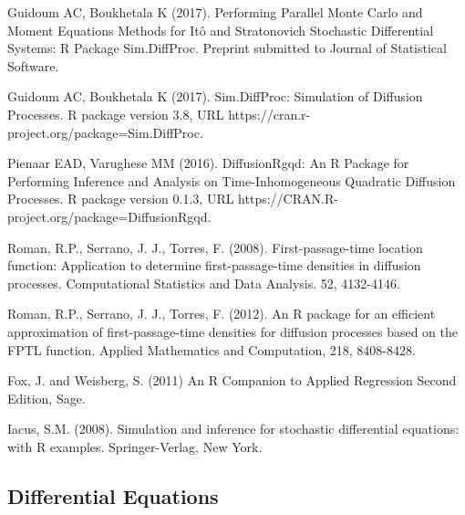 \begin{thebibliography}{00}
Guidoum AC, Boukhetala K (2017). 
\newblock Performing Parallel Monte Carlo and Moment Equations Methods for Itô and Stratonovich Stochastic Differential Systems: R Package Sim.DiffProc. 
\newblock Preprint submitted to Journal of Statistical Software.

Guidoum AC, Boukhetala K (2017). 
\newblock Sim.DiffProc: Simulation of Diffusion Processes. 
\newblock R package version 3.8, URL https://cran.r-project.org/package=Sim.DiffProc.

Pienaar EAD, Varughese MM (2016). 
\newblock DiffusionRgqd: An R Package for Performing Inference and Analysis on Time-Inhomogeneous Quadratic Diffusion Processes. 
\newblock R package version 0.1.3, URL https://CRAN.R-project.org/package=DiffusionRgqd.

Roman, R.P., Serrano, J. J., Torres, F. (2008). 
\newblock First-passage-time location function: Application to determine first-passage-time densities in diffusion processes. 
\newblock Computational Statistics and Data Analysis. 52, 4132-4146.

Roman, R.P., Serrano, J. J., Torres, F. (2012). 
\newblock An R package for an efficient approximation of first-passage-time densities for diffusion processes based on the FPTL function. 
\newblock Applied Mathematics and Computation, 218, 8408-8428.

Fox, J. and Weisberg, S. (2011) 
\newblock An R Companion to Applied Regression
\newblock Second Edition, Sage.

Iacus, S.M. (2008). 
\newblock Simulation and inference for stochastic differential equations: with R examples. 
\newblock Springer-Verlag, New York.


\subsection{Differential Equations}


\end{thebibliography}
